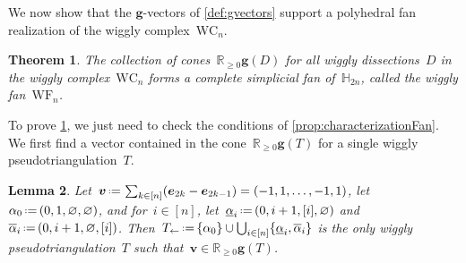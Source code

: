\documentclass{amsart}
\newtheorem{theorem}{Theorem}%
\newtheorem{lemma}[theorem]{Lemma}
\theoremstyle{definition}
\newcommand{\R}{\mathbb{R}} %
\newcommand{\HH}{\mathbb{H}} %
\renewcommand{\b}[1]{{\boldsymbol{#1}}} %
\newcommand{\eqdef}{\mbox{\,\raisebox{0.2ex}{\scriptsize\ensuremath{\mathrm:}}\ensuremath{=}\,}} %
\newcommand{\darkblue}{\color{darkblue}} %
\newcommand{\defn}[1]{\textsl{\darkblue #1}} %
\newcommand{\wigglyComplex}{\mathrm{WC}} %
\newcommand{\wigglyFan}{\mathrm{WF}} %
\begin{document}
We now show that the $\b{g}$-vectors of \cref{def:gvectors} support a polyhedral fan realization of the wiggly complex~$\wigglyComplex_n$.

\begin{theorem}
\label{thm:wigglyFan}
The collection of cones~$\R_{\ge 0} \b{g}(D) $ for all wiggly dissections~$D$ in the wiggly complex~$\wigglyComplex_n$ forms a complete simplicial fan of~$\HH_{2n}$, called the \defn{wiggly fan}~$\wigglyFan_n$.
\end{theorem}

To prove \cref{thm:wigglyFan}, we just need to check the conditions of \cref{prop:characterizationFan}.
We first find a vector contained in the cone~$\R_{\ge 0} \b{g}(T)$ for a single wiggly pseudotriangulation~$T$.

\begin{lemma}
\label{lem:-+...-+}
Let~$\b{v} \eqdef \sum_{k \in [n]} (\b{e}_{2k} - \b{e}_{2k-1}) = (-1, 1, \dots, -1, 1)$, let~$\alpha_0 \eqdef (0, 1, \varnothing, \varnothing)$, and for~${i \in [n]}$, let~$\underline{\alpha}_i \eqdef (0, i+1, [i], \varnothing)$ and~$\overline{\alpha}_i \eqdef (0, i+1, \varnothing, [i])$.
Then~$T_\leftarrow \eqdef \{\alpha_0\} \cup \bigcup_{i \in [n]} \{\underline{\alpha}_i, \overline{\alpha}_i\}$ is the only wiggly pseudotriangulation~$T$ such that~$\b{v} \in \R_{\ge 0} \b{g}(T)$.
\end{lemma}
\end{document}
